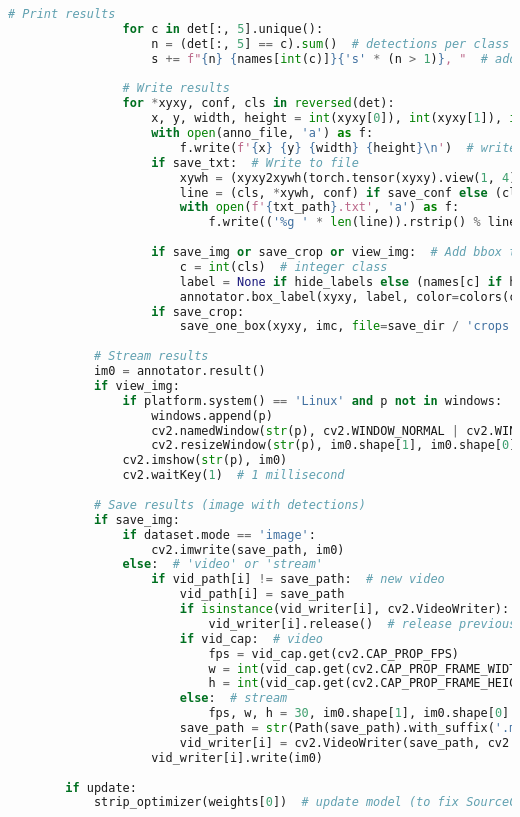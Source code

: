 \begin{lstlisting}[language=Python]
				# Print results
				for c in det[:, 5].unique():
					n = (det[:, 5] == c).sum()  # detections per class
					s += f"{n} {names[int(c)]}{'s' * (n > 1)}, "  # add to string
	
				# Write results
				for *xyxy, conf, cls in reversed(det):
					x, y, width, height = int(xyxy[0]), int(xyxy[1]), int(xyxy[2]-xyxy[0]), int(xyxy[3]-xyxy[1])
					with open(anno_file, 'a') as f:
						f.write(f'{x} {y} {width} {height}\n')  # write image coordinates
					if save_txt:  # Write to file
						xywh = (xyxy2xywh(torch.tensor(xyxy).view(1, 4)) / gn).view(-1).tolist()  # normalized xywh
						line = (cls, *xywh, conf) if save_conf else (cls, *xywh)  # label format
						with open(f'{txt_path}.txt', 'a') as f:
							f.write(('%g ' * len(line)).rstrip() % line + '\n')
	
					if save_img or save_crop or view_img:  # Add bbox to image
						c = int(cls)  # integer class
						label = None if hide_labels else (names[c] if hide_conf else f'{names[c]} {conf:.2f}')
						annotator.box_label(xyxy, label, color=colors(c, True))
					if save_crop:
						save_one_box(xyxy, imc, file=save_dir / 'crops' / names[c] / f'{p.stem}.jpg', BGR=True)
	
			# Stream results
			im0 = annotator.result()
			if view_img:
				if platform.system() == 'Linux' and p not in windows:
					windows.append(p)
					cv2.namedWindow(str(p), cv2.WINDOW_NORMAL | cv2.WINDOW_KEEPRATIO)  # allow window resize (Linux)
					cv2.resizeWindow(str(p), im0.shape[1], im0.shape[0])
				cv2.imshow(str(p), im0)
				cv2.waitKey(1)  # 1 millisecond
	
			# Save results (image with detections)
			if save_img:
				if dataset.mode == 'image':
					cv2.imwrite(save_path, im0)
				else:  # 'video' or 'stream'
					if vid_path[i] != save_path:  # new video
						vid_path[i] = save_path
						if isinstance(vid_writer[i], cv2.VideoWriter):
							vid_writer[i].release()  # release previous video writer
						if vid_cap:  # video
							fps = vid_cap.get(cv2.CAP_PROP_FPS)
							w = int(vid_cap.get(cv2.CAP_PROP_FRAME_WIDTH))
							h = int(vid_cap.get(cv2.CAP_PROP_FRAME_HEIGHT))
						else:  # stream
							fps, w, h = 30, im0.shape[1], im0.shape[0]
						save_path = str(Path(save_path).with_suffix('.mp4'))  # force *.mp4 suffix on results videos
						vid_writer[i] = cv2.VideoWriter(save_path, cv2.VideoWriter_fourcc(*'mp4v'), fps, (w, h))
					vid_writer[i].write(im0)
			
		if update:
			strip_optimizer(weights[0])  # update model (to fix SourceChangeWarning)
\end{lstlisting}